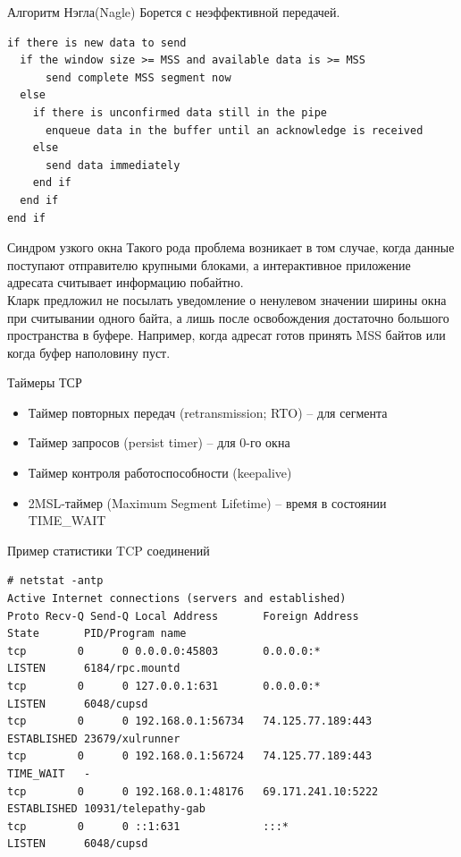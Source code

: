 \begin{frame}[fragile]{Алгоритм Нэгла(Nagle)}
Борется с неэффективной передачей.
\begin{verbatim}
if there is new data to send
  if the window size >= MSS and available data is >= MSS
      send complete MSS segment now
  else
    if there is unconfirmed data still in the pipe
      enqueue data in the buffer until an acknowledge is received
    else
      send data immediately
    end if
  end if
end if
\end{verbatim}
\end{frame}



\begin{frame}{Синдром узкого окна}
Такого рода проблема возникает в том случае,  когда данные поступают отправителю крупными блоками,  а интерактивное приложение адресата считывает информацию побайтно.\\
\bigskip
\pause
Кларк предложил не посылать уведомление о ненулевом значении ширины окна при считывании одного байта,  а лишь после освобождения достаточно большого пространства в буфере. Например,  когда адресат готов принять MSS байтов или когда буфер наполовину пуст.
\end{frame}


\begin{frame}{Таймеры ТСР}
	\begin{itemize}
		\item Таймер повторных передач (retransmission; RTO) -- для сегмента
		\item Таймер запросов (persist timer) -- для 0-го окна
		\item Таймер контроля работоспособности (keepalive)
		\item 2MSL-таймер (Maximum Segment Lifetime) -- время в состоянии TIME\_WAIT
	\end{itemize}

\end{frame}

\begin{frame}[fragile]{Пример статистики TCP соединений}
	\tiny
	\begin{verbatim}
# netstat -antp
Active Internet connections (servers and established)
Proto Recv-Q Send-Q Local Address       Foreign Address             State       PID/Program name   
tcp        0      0 0.0.0.0:45803       0.0.0.0:*                   LISTEN      6184/rpc.mountd     
tcp        0      0 127.0.0.1:631       0.0.0.0:*                   LISTEN      6048/cupsd          
tcp        0      0 192.168.0.1:56734   74.125.77.189:443           ESTABLISHED 23679/xulrunner     
tcp        0      0 192.168.0.1:56724   74.125.77.189:443           TIME_WAIT   -                   
tcp        0      0 192.168.0.1:48176   69.171.241.10:5222          ESTABLISHED 10931/telepathy-gab 
tcp        0      0 ::1:631             :::*                        LISTEN      6048/cupsd          
	\end{verbatim}
	\normalsize
\end{frame}

